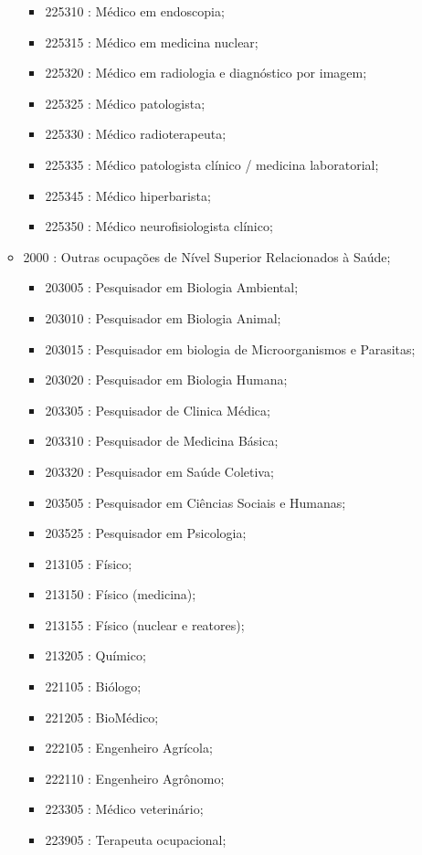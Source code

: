 \begin{itemize}
\begin{itemize}
\begin{itemize}
      \item 225310 : Médico em endoscopia;
      \item 225315 : Médico em medicina nuclear;
      \item 225320 : Médico em radiologia e diagnóstico por imagem;
      \item 225325 : Médico patologista;
      \item 225330 : Médico radioterapeuta;
      \item 225335 : Médico patologista clínico / medicina laboratorial;
      \item 225345 : Médico hiperbarista;
      \item 225350 : Médico neurofisiologista clínico;
    \end{itemize}
    \item 2000 : Outras ocupações de Nível Superior Relacionados à Saúde;
    \begin{itemize}
      \item 203005 : Pesquisador em Biologia Ambiental;
      \item 203010 : Pesquisador em Biologia Animal;
      \item 203015 : Pesquisador em biologia de Microorganismos e Parasitas;
      \item 203020 : Pesquisador em Biologia Humana;
      \item 203305 : Pesquisador de Clinica Médica;
      \item 203310 : Pesquisador de Medicina Básica;
      \item 203320 : Pesquisador em Saúde Coletiva;
      \item 203505 : Pesquisador em Ciências Sociais e Humanas;
      \item 203525 : Pesquisador em Psicologia;
      \item 213105 : Físico;
      \item 213150 : Físico (medicina);
      \item 213155 : Físico (nuclear e reatores);
      \item 213205 : Químico;
      \item 221105 : Biólogo;
      \item 221205 : BioMédico;
      \item 222105 : Engenheiro Agrícola;
      \item 222110 : Engenheiro Agrônomo;
      \item 223305 : Médico veterinário;
      \item 223905 : Terapeuta ocupacional;

\end{itemize}
\end{itemize}
\end{itemize}
